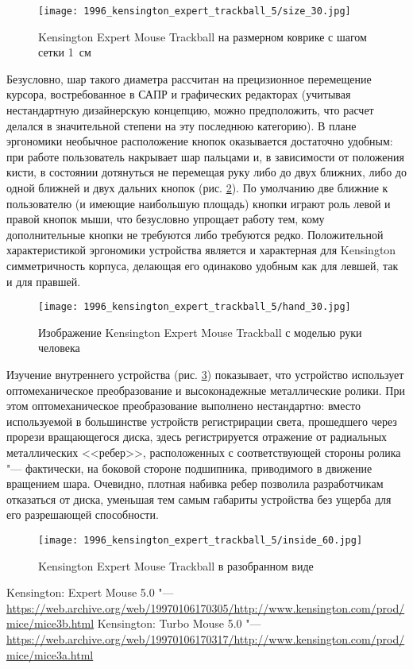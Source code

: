 \documentclass[11pt, a4paper]{article}
\begin{document}
\begin{figure}[h]
    \centering
    \texttt{[image: 1996\_kensington\_expert\_trackball\_5/size\_30.jpg]}
    \caption{Kensington Expert Mouse Trackball на размерном коврике с шагом сетки 1~см}
    \label{fig:ExpertMouseSize}
\end{figure}

Безусловно, шар такого диаметра рассчитан на прецизионное перемещение курсора, востребованное в САПР и графических редакторах (учитывая нестандартную дизайнерскую концепцию, можно предположить, что расчет делался в значительной степени на эту последнюю категорию). В плане эргономики необычное расположение кнопок оказывается достаточно удобным: при работе пользователь накрывает шар пальцами и, в зависимости от положения кисти, в состоянии дотянуться не перемещая руку либо до двух ближних, либо до одной ближней и двух дальних кнопок (рис. \ref{fig:ExpertMouseHand}). По умолчанию две ближние к пользователю (и имеющие наибольшую площадь) кнопки играют роль левой и правой кнопок мыши, что безусловно упрощает работу тем, кому дополнительные кнопки не требуются либо требуются редко. Положительной характеристикой эргономики устройства является и характерная для Kensington  симметричность корпуса, делающая его одинаково удобным как для левшей, так и для правшей.

\begin{figure}[h]
    \centering
    \texttt{[image: 1996\_kensington\_expert\_trackball\_5/hand\_30.jpg]}
    \caption{Изображение Kensington Expert Mouse Trackball с моделью руки человека}
    \label{fig:ExpertMouseHand}
\end{figure}

Изучение внутреннего устройства (рис. \ref{fig:ExpertMouseInside}) показывает, что устройство использует  оптомеханическое преобразование и высоконадежные металлические ролики. При этом оптомеханическое преобразование выполнено нестандартно: вместо используемой в большинстве устройств регистрирации света, прошедшего через прорези вращающегося диска, здесь регистрируется отражение от радиальных металлических <<ребер>>, расположенных с соответствующей стороны ролика "--- фактически, на боковой стороне подшипника, приводимого в движение вращением шара. Очевидно, плотная набивка ребер позволила разработчикам отказаться от диска, уменьшая тем самым габариты устройства без ущерба для его разрешающей способности.

\begin{figure}[h]
    \centering
    \texttt{[image: 1996\_kensington\_expert\_trackball\_5/inside\_60.jpg]}
    \caption{Kensington Expert Mouse Trackball в разобранном виде}
    \label{fig:ExpertMouseInside}
\end{figure}

\begin{thebibliography}{9}

 Kensington: Expert Mouse 5.0 "--- \url{https://web.archive.org/web/19970106170305/http://www.kensington.com/prod/mice/mice3b.html}
 Kensington: Turbo Mouse 5.0 "--- \url{https://web.archive.org/web/19970106170317/http://www.kensington.com/prod/mice/mice3a.html}
\end{thebibliography}
\end{document}
